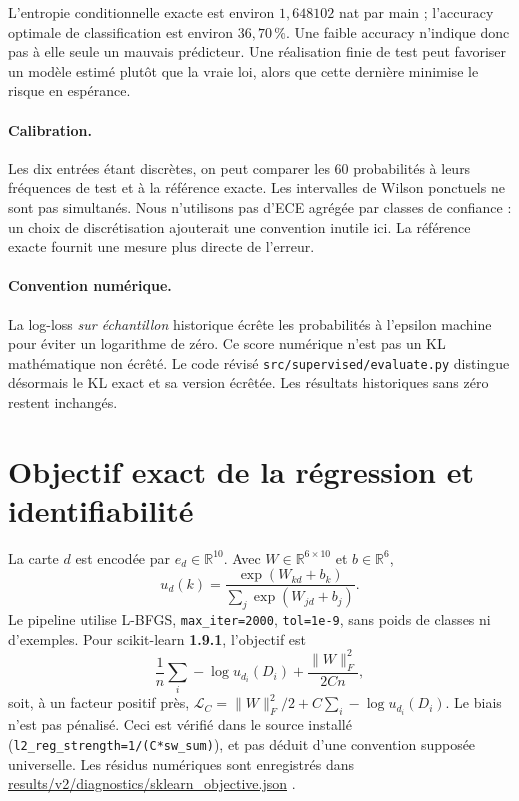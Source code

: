 \documentclass[11pt,a4paper]{article}
\theoremstyle{remark}\newtheorem*{remarque}{Remarque}
\newcommand{\1}{\mathbf 1}
\begin{document}
L'entropie conditionnelle exacte est environ $1{,}648102$ nat par main ;
l'accuracy optimale de classification est environ $36{,}70\,\%$.
Une faible accuracy n'indique donc pas à elle seule un mauvais prédicteur.
Une réalisation finie de test peut favoriser un modèle estimé plutôt que la vraie
loi, alors que cette dernière minimise le risque en espérance.

\paragraph{Calibration.} Les dix entrées étant discrètes, on peut comparer les
60 probabilités à leurs fréquences de test et à la référence exacte. Les intervalles
de Wilson ponctuels ne sont pas simultanés. Nous n'utilisons pas d'ECE agrégée
par classes de confiance : un choix de discrétisation ajouterait une convention
inutile ici. La référence exacte fournit une mesure plus directe de l'erreur.

\paragraph{Convention numérique.} La log-loss \emph{sur échantillon} historique
écrête les probabilités à l'epsilon machine pour éviter un logarithme de zéro.
Ce score numérique n'est pas un KL mathématique non écrêté. Le code révisé
\texttt{src/supervised/evaluate.py} distingue désormais le KL exact et sa version
écrêtée. Les résultats historiques sans zéro restent inchangés.

\section{Objectif exact de la régression et identifiabilité}
La carte $d$ est encodée par $e_d\in\mathbb R^{10}$. Avec
$W\in\mathbb R^{6\times10}$ et $b\in\mathbb R^6$,
\[
 u_d(k)=\frac{\exp(W_{kd}+b_k)}{\sum_j\exp(W_{jd}+b_j)}.
\]
Le pipeline utilise L-BFGS, \texttt{max\_iter=2000}, \texttt{tol=1e-9}, sans
poids de classes ni d'exemples. Pour scikit-learn \textbf{1.9.1}, l'objectif est
\begin{equation}\label{eq:objective}
 \frac1n\sum_i-\log u_{d_i}(D_i)+\frac{\|W\|_F^2}{2Cn},
\end{equation}
soit, à un facteur positif près, $\mathcal L_C=\|W\|_F^2/2+C\sum_i-\log u_{d_i}(D_i)$.
Le biais n'est pas pénalisé. Ceci est vérifié dans le source installé
(\texttt{l2\_reg\_strength=1/(C*sw\_sum)}), et pas déduit d'une convention
supposée universelle. Les résidus numériques sont enregistrés dans
\url{results/v2/diagnostics/sklearn_objective.json} \cite{sklearn}.
\end{document}

